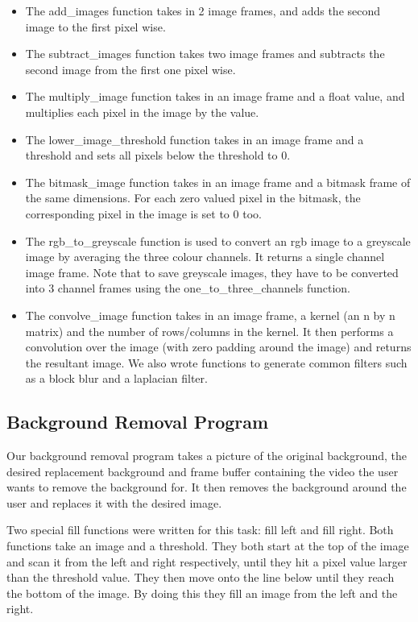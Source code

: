 \documentclass[11pt]{article}
\begin{document}
  \begin{itemize}
\item The add\_images function takes in 2 image frames, and adds the second image to the first pixel wise.

\item The subtract\_images function takes two image frames and subtracts the second image from the first one pixel wise.

\item The multiply\_image function takes in an image frame and a float value, and multiplies each pixel in the image by the value.

\item The lower\_image\_threshold function takes in an image frame and a threshold and sets all pixels below the threshold to 0.

\item The bitmask\_image function takes in an image frame and a bitmask frame of the same dimensions. For each zero valued pixel in the bitmask, the corresponding pixel in the image is set to 0 too.

\item The rgb\_to\_greyscale function is used to convert an rgb image to a greyscale image by averaging the three colour channels. It returns a single channel image frame. Note that to save greyscale images, they have to be converted into 3 channel frames using the  one\_to\_three\_channels function.

\item The convolve\_image function takes in an image frame, a kernel (an n by n matrix) and the number of rows/columns in the kernel. It then performs a convolution over the image (with zero padding around the image) and returns the resultant image. We also wrote functions to generate common filters such as a block blur and a laplacian filter.

\end{itemize}

  \subsection*{Background Removal Program}
Our background removal program takes a picture of the original background, the desired replacement background and frame buffer containing the video the user wants to remove the background for. It then removes the background around the user and replaces it with the desired image. 

Two special fill functions were written for this task: fill left and fill right. Both functions take an image and a threshold. They both start at the top of the image and scan it from the left and right respectively, until they hit a pixel value larger than the threshold value. They then move onto the line below until they reach the bottom of the image. By doing this they fill an image from the left and the right.
\end{document}
